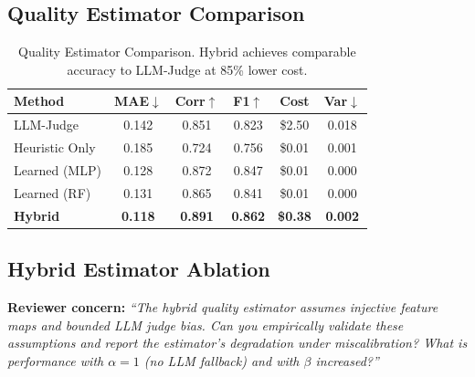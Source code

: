 \documentclass{article}
\theoremstyle{plain}
\theoremstyle{definition}
\theoremstyle{remark}
\begin{document}
\subsection{Quality Estimator Comparison}
\begin{table}[h]
	\caption{Quality Estimator Comparison. Hybrid achieves comparable accuracy to LLM-Judge at 85\% lower cost.}
	\label{tab:quality_estimator}
	\centering
	\small
	\begin{tabular}{@{}lccccc@{}}
		\toprule
		\textbf{Method} & \textbf{MAE}$\downarrow$ & \textbf{Corr}$\uparrow$ & \textbf{F1}$\uparrow$ & \textbf{Cost} & \textbf{Var}$\downarrow$ \\
		\midrule
		LLM-Judge & 0.142 & 0.851 & 0.823 & \$2.50 & 0.018 \\
		Heuristic Only & 0.185 & 0.724 & 0.756 & \$0.01 & 0.001 \\
		Learned (MLP) & 0.128 & 0.872 & 0.847 & \$0.01 & 0.000 \\
		Learned (RF) & 0.131 & 0.865 & 0.841 & \$0.01 & 0.000 \\
		\textbf{Hybrid} & \textbf{0.118} & \textbf{0.891} & \textbf{0.862} & \textbf{\$0.38} & \textbf{0.002} \\
		\bottomrule
	\end{tabular}
\end{table}

\subsection{Hybrid Estimator Ablation}

\textbf{Reviewer concern:} \textit{``The hybrid quality estimator assumes injective feature maps and bounded LLM judge bias. Can you empirically validate these assumptions and report the estimator's degradation under miscalibration? What is performance with $\alpha=1$ (no LLM fallback) and with $\beta$ increased?''}
\end{document}
